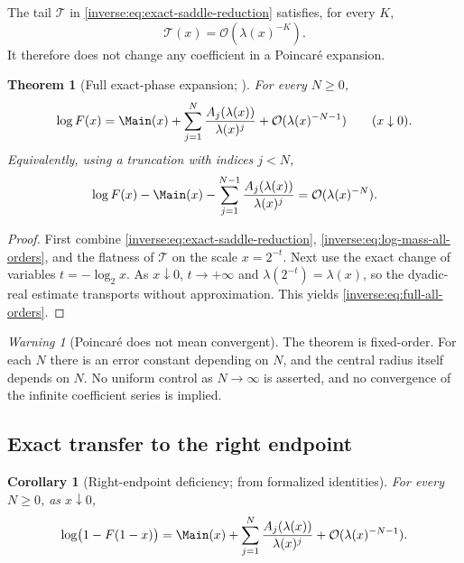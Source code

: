 \documentclass[11pt,oneside]{article}
\newtheorem{theorem}{Theorem}[section]
\newtheorem{corollary}[corollary]{Corollary}
\theoremstyle{definition}
\theoremstyle{remark}
\newtheorem{warning}[warning]{Warning}
\newcommand{\bigO}{\mathcal O}
\begin{document}
The tail $\mathcal T$ in \eqref{inverse:eq:exact-saddle-reduction} satisfies, for
every $K$,
\[
 \mathcal T(x)=\bigO(\lambda(x)^{-K}).
\]
It therefore does not change any coefficient in a Poincar\'e expansion.

\begin{theorem}[Full exact-phase expansion; \Formalized]
\label{inverse:thm:full-all-orders}
For every $N\geq0$,
\begin{equation}
 \log F(x)
 =\Main(x)+
   \sum_{j=1}^{N}\frac{A_j(\lambda(x))}{\lambda(x)^j}
   +\bigO(\lambda(x)^{-N-1})
 \qquad(x\downarrow0). \label{inverse:eq:full-all-orders}
\end{equation}
Equivalently, using a truncation with indices $j<N$,
\[
 \log F(x)-\Main(x)-
 \sum_{j=1}^{N-1}\frac{A_j(\lambda(x))}{\lambda(x)^j}
 =\bigO(\lambda(x)^{-N}).
\]
\end{theorem}

\begin{proof}
First combine \eqref{inverse:eq:exact-saddle-reduction},
\eqref{inverse:eq:log-mass-all-orders}, and the flatness of $\mathcal T$ on the
scale $x=2^{-t}$.  Next use the exact change of variables
$t=-\log_2x$.  As $x\downarrow0$, $t\to+\infty$ and
$\lambda(2^{-t})=\lambda(x)$, so the dyadic-real estimate transports
without approximation.  This yields \eqref{inverse:eq:full-all-orders}.
\end{proof}

\begin{warning}[Poincar\'e does not mean convergent]
The theorem is fixed-order.  For each $N$ there is an error constant
depending on $N$, and the central radius itself depends on $N$.  No
uniform control as $N\to\infty$ is asserted, and no convergence of the
infinite coefficient series is implied.
\end{warning}

\subsection{Exact transfer to the right endpoint}

\begin{corollary}[Right-endpoint deficiency; \Derived{} from formalized identities]
\label{inverse:cor:right-endpoint-all-orders}
For every \(N\geq0\), as \(x\downarrow0\),
\begin{equation}
 \log\bigl(1-F(1-x)\bigr)
 =\Main(x)+
   \sum_{j=1}^{N}\frac{A_j(\lambda(x))}{\lambda(x)^j}
   +\bigO(\lambda(x)^{-N-1}).
 \label{inverse:eq:right-endpoint-all-orders}
\end{equation}
\end{corollary}
\end{document}
